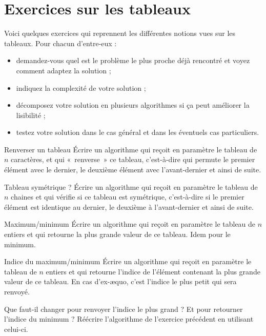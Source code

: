 \chapter{Exercices sur les tableaux}

	Voici quelques exercices
	qui reprennent les différentes notions vues sur les tableaux.
	Pour chacun d'entre-eux :
	\begin{itemize}
	\item
		demandez-vous quel est le problème le plus proche déjà
		rencontré et voyez comment adaptez la solution ;
	\item
		indiquez la complexité de votre solution ;
	\item
		décomposez votre solution en plusieurs algorithmes 
		si ça peut améliorer la lisibilité ;
	\item
		testez votre solution dans le cas général
		et dans les éventuels cas particuliers.
	\end{itemize}
	
	\begin{Exercice}{Renverser un tableau}
		Écrire un algorithme qui reçoit en paramètre 
		le tableau  de $n$ caractères, 
		et qui «~renverse~» ce tableau, 
		c’est-à-dire qui permute le premier élément avec le dernier, 
		le deuxième élément avec l’avant-dernier et ainsi de suite.
	\end{Exercice}
	
	\begin{Exercice}{Tableau symétrique ?}
		Écrire un algorithme qui reçoit en paramètre 
		le tableau  de $n$ chaines 
		et qui vérifie si ce tableau est symétrique, 
		c’est-à-dire si le premier élément est identique au dernier, 
		le deuxième à l’avant-dernier et ainsi de suite.
	\end{Exercice}
		
	\begin{Exercice}{Maximum/minimum}
		Écrire un algorithme qui reçoit en paramètre le tableau
		 de $n$ entiers et qui
		retourne la plus grande valeur de ce tableau. Idem pour le minimum.
	\end{Exercice}
	
	\begin{Exercice}{Indice du maximum/minimum}
		\label{ex:indiceminmax}
		Écrire un algorithme qui reçoit en paramètre 
		le tableau  de $n$ entiers 
		et qui retourne l’indice de l’élément contenant 
		la plus grande valeur de ce tableau. 
		En cas d’ex-æquo, c’est l’indice le plus petit qui sera renvoyé.
		
		Que faut-il changer pour renvoyer l’indice le plus grand ?
		Et pour retourner l’indice du minimum ? 
		Réécrire l’algorithme de l’exercice précédent en utilisant celui-ci.
	\end{Exercice}
		
